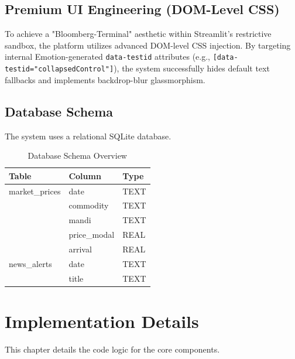 \documentclass[a4paper,12pt]{report}
\begin{document}
\section{Premium UI Engineering (DOM-Level CSS)}
To achieve a "Bloomberg-Terminal" aesthetic within Streamlit's restrictive sandbox, the platform utilizes advanced DOM-level CSS injection. By targeting internal Emotion-generated \texttt{data-testid} attributes (e.g., \texttt{[data-testid="collapsedControl"]}), the system successfully hides default text fallbacks and implements backdrop-blur glassmorphism.

\section{Database Schema}
The system uses a relational SQLite database.
\begin{table}[H]
    \centering
    \begin{tabular}{|l|l|l|}
    \hline
    \textbf{Table} & \textbf{Column} & \textbf{Type} \\ \hline
    market\_prices & date & TEXT \\
                   & commodity & TEXT \\
                   & mandi & TEXT \\
                   & price\_modal & REAL \\
                   & arrival & REAL \\ \hline
    news\_alerts   & date & TEXT \\
                   & title & TEXT \\ \hline
    \end{tabular}
    \caption{Database Schema Overview}
\end{table}

\chapter{Implementation Details}
This chapter details the code logic for the core components.
\end{document}
